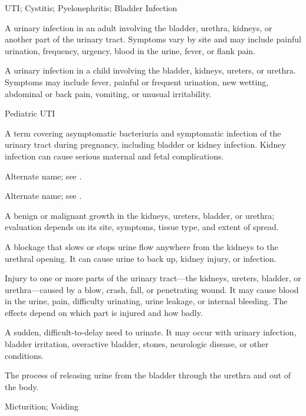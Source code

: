 \synonyms
UTI; Cystitis; Pyelonephritis; Bladder Infection

 A urinary infection in an adult involving the bladder, urethra, kidneys, or another part of the urinary tract. Symptoms vary by site and may include painful urination, frequency, urgency, blood in the urine, fever, or flank pain.

 A urinary infection in a child involving the bladder, kidneys, ureters, or urethra. Symptoms may include fever, painful or frequent urination, new wetting, abdominal or back pain, vomiting, or unusual irritability.

\synonyms
Pediatric UTI

 A term covering asymptomatic bacteriuria and symptomatic infection of the urinary tract during pregnancy, including bladder or kidney infection. Kidney infection can cause serious maternal and fetal complications.

 Alternate name; see .

 Alternate name; see .

 A benign or malignant growth in the kidneys, ureters, bladder, or urethra; evaluation depends on its site, symptoms, tissue type, and extent of spread.

 A blockage that slows or stops urine flow anywhere from the kidneys to the urethral opening. It can cause urine to back up, kidney injury, or infection.

 Injury to one or more parts of the urinary tract—the kidneys, ureters, bladder, or urethra—caused by a blow, crash, fall, or penetrating wound. It may cause blood in the urine, pain, difficulty urinating, urine leakage, or internal bleeding. The effects depend on which part is injured and how badly.

 A sudden, difficult-to-delay need to urinate. It may occur with urinary infection, bladder irritation, overactive bladder, stones, neurologic disease, or other conditions.

 The process of releasing urine from the bladder through the urethra and out of the body.

\synonyms
Micturition; Voiding

